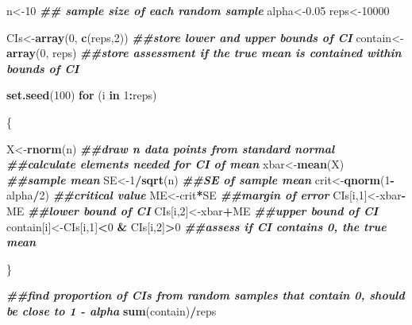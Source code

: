 \documentclass[
]{book}
\newenvironment{Shaded}{\begin{snugshade}}{\end{snugshade}}
\newcommand{\ControlFlowTok}[1]{\textcolor[rgb]{0.13,0.29,0.53}{\textbf{#1}}}
\newcommand{\DecValTok}[1]{\textcolor[rgb]{0.00,0.00,0.81}{#1}}
\newcommand{\DocumentationTok}[1]{\textcolor[rgb]{0.56,0.35,0.01}{\textbf{\textit{#1}}}}
\newcommand{\FloatTok}[1]{\textcolor[rgb]{0.00,0.00,0.81}{#1}}
\newcommand{\FunctionTok}[1]{\textcolor[rgb]{0.13,0.29,0.53}{\textbf{#1}}}
\newcommand{\NormalTok}[1]{#1}
\newcommand{\OtherTok}[1]{\textcolor[rgb]{0.56,0.35,0.01}{#1}}
\newcommand{\SpecialCharTok}[1]{\textcolor[rgb]{0.81,0.36,0.00}{\textbf{#1}}}
\begin{document}
\begin{Shaded}
\begin{Highlighting}[]
\NormalTok{n}\OtherTok{\textless{}{-}}\DecValTok{10} \DocumentationTok{\#\# sample size of each random sample}
\NormalTok{alpha}\OtherTok{\textless{}{-}}\FloatTok{0.05}
\NormalTok{reps}\OtherTok{\textless{}{-}}\DecValTok{10000} 

\NormalTok{CIs}\OtherTok{\textless{}{-}}\FunctionTok{array}\NormalTok{(}\DecValTok{0}\NormalTok{, }\FunctionTok{c}\NormalTok{(reps,}\DecValTok{2}\NormalTok{)) }\DocumentationTok{\#\#store lower and upper bounds of CI}
\NormalTok{contain}\OtherTok{\textless{}{-}}\FunctionTok{array}\NormalTok{(}\DecValTok{0}\NormalTok{, reps) }\DocumentationTok{\#\#store assessment if the true mean is contained within bounds of CI}

\FunctionTok{set.seed}\NormalTok{(}\DecValTok{100}\NormalTok{)}
\ControlFlowTok{for}\NormalTok{ (i }\ControlFlowTok{in} \DecValTok{1}\SpecialCharTok{:}\NormalTok{reps)}
  
\NormalTok{\{}
  
\NormalTok{  X}\OtherTok{\textless{}{-}}\FunctionTok{rnorm}\NormalTok{(n) }\DocumentationTok{\#\#draw n data points from standard normal}
  \DocumentationTok{\#\#calculate elements needed for CI of mean}
\NormalTok{  xbar}\OtherTok{\textless{}{-}}\FunctionTok{mean}\NormalTok{(X) }\DocumentationTok{\#\#sample mean}
\NormalTok{  SE}\OtherTok{\textless{}{-}}\DecValTok{1}\SpecialCharTok{/}\FunctionTok{sqrt}\NormalTok{(n) }\DocumentationTok{\#\#SE of sample mean}
\NormalTok{  crit}\OtherTok{\textless{}{-}}\FunctionTok{qnorm}\NormalTok{(}\DecValTok{1}\SpecialCharTok{{-}}\NormalTok{alpha}\SpecialCharTok{/}\DecValTok{2}\NormalTok{) }\DocumentationTok{\#\#critical value}
\NormalTok{  ME}\OtherTok{\textless{}{-}}\NormalTok{crit}\SpecialCharTok{*}\NormalTok{SE }\DocumentationTok{\#\#margin of error}
\NormalTok{  CIs[i,}\DecValTok{1}\NormalTok{]}\OtherTok{\textless{}{-}}\NormalTok{xbar}\SpecialCharTok{{-}}\NormalTok{ME }\DocumentationTok{\#\#lower bound of CI}
\NormalTok{  CIs[i,}\DecValTok{2}\NormalTok{]}\OtherTok{\textless{}{-}}\NormalTok{xbar}\SpecialCharTok{+}\NormalTok{ME }\DocumentationTok{\#\#upper bound of CI}
\NormalTok{  contain[i]}\OtherTok{\textless{}{-}}\NormalTok{CIs[i,}\DecValTok{1}\NormalTok{]}\SpecialCharTok{\textless{}}\DecValTok{0} \SpecialCharTok{\&}\NormalTok{ CIs[i,}\DecValTok{2}\NormalTok{]}\SpecialCharTok{\textgreater{}}\DecValTok{0} \DocumentationTok{\#\#assess if CI contains 0, the true mean}
  
\NormalTok{\}}

\DocumentationTok{\#\#find proportion of CIs from random samples that contain 0, should be close to 1 {-} alpha}
\FunctionTok{sum}\NormalTok{(contain)}\SpecialCharTok{/}\NormalTok{reps }
\end{Highlighting}
\end{Shaded}
\end{document}
